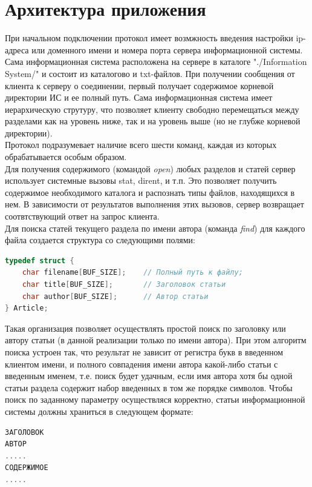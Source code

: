\documentclass[12pt,a4paper]{report}
\begin{document}
\section{Архитектура приложения}

\hspace*{2em} При начальном подключении протокол имеет возмжность введения настройки ip-адреса или доменного имени и номера порта сервера информационной системы.  
\\ 
\hspace*{2em} Сама информационная система расположена на сервере в каталоге "./Information System/" и состоит из каталогово и txt-файлов. При получении сообщения от клиента к серверу о соединении, первый получает содержимое корневой директории ИС и ее полный путь. Сама информационная система имеет иерархическую струтуру, что позволяет клиенту свободно перемещаться между разделами как на уровень ниже, так и на уровень выше (но не глубже корневой директории).
\\
\hspace*{2em} Протокол  подразумевает наличие всего шести команд, каждая из которых обрабатывается особым образом.
\\
\hspace*{2em} Для получения содержимого (командой \textit{open}) любых разделов и статей сервер использует системные вызовы stat, dirent, и т.п. Это позволяет получить содержимое необходимого каталога и распознать типы файлов, находящихся в нем. В зависимости от результатов выполнения этих вызовов, сервер возвращает соотвтствующий ответ на запрос клиента.
\\
\hspace*{2em} Для поиска статей текущего раздела по имени автора (команда \textit{find}) для каждого файла создается структура со следующими полями: 
\begin{lstlisting}[language=C]
typedef struct {
	char filename[BUF_SIZE]; 	// Полный путь к файлу;
	char title[BUF_SIZE];		// Заголовок статьи
	char author[BUF_SIZE];		// Автор статьи
} Article;
\end{lstlisting}

Такая организация позволяет осуществлять простой поиск по заголовку или автору статьи (в данной реализации только по имени автора). 
При этом алгоритм поиска устроен так, что результат не зависит от регистра букв в введенном клиентом имени, и полного совпадения имени автора какой-либо статьи с введенным именем, т.е. поиск будет удачным, если имя автора хотя бы одной статьи раздела содержит набор введенных в том же порядке символов.
Чтобы поиск по заданному параметру осуществляся корректно, статьи информационной системы должны храниться в следующем формате:
\begin{lstlisting}[language=C]
ЗАГОЛОВОК
АВТОР
.....
СОДЕРЖИМОЕ
.....
\end{lstlisting}
\end{document}

